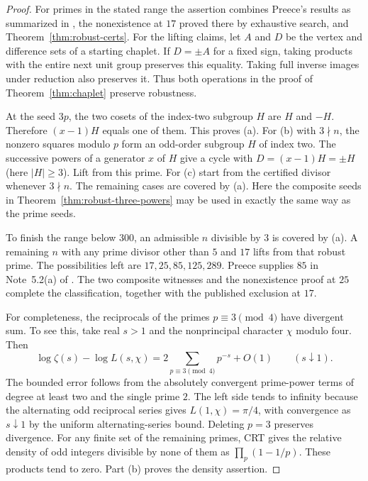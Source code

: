 \documentclass[11pt,a4paper]{article}
\begin{document}
\begin{proof}
For primes in the stated range the assertion combines Preece's results as summarized in \cite[Section~6]{mo}, the nonexistence at $17$ proved there by exhaustive search, and Theorem~\ref{thm:robust-certs}. For the lifting claims, let $A$ and $D$ be the vertex and difference sets of a starting chaplet. If $D=\pm A$ for a fixed sign, taking products with the entire next unit group preserves this equality. Taking full inverse images under reduction also preserves it. Thus both operations in the proof of Theorem~\ref{thm:chaplet} preserve robustness.
\par
At the seed $3p$, the two cosets of the index-two subgroup $H$ are $H$ and $-H$. Therefore $(x-1)H$ equals one of them. This proves (a). For (b) with $3\nmid n$, the nonzero squares modulo $p$ form an odd-order subgroup $H$ of index two. The successive powers of a generator $x$ of $H$ give a cycle with $D=(x-1)H=\pm H$ (here $|H|\ge3$). Lift from this prime. For (c) start from the certified divisor whenever $3\nmid n$. The remaining cases are covered by (a). Here the composite seeds in Theorem~\ref{thm:robust-three-powers} may be used in exactly the same way as the prime seeds.
\par
To finish the range below $300$, an admissible $n$ divisible by $3$ is covered by (a). A remaining $n$ with any prime divisor other than $5$ and $17$ lifts from that robust prime. The possibilities left are $17,25,85,125,289$. Preece supplies $85$ in Note~5.2(a) of \cite{chaplet}. The two composite witnesses and the nonexistence proof at $25$ complete the classification, together with the published exclusion at $17$.
\par
For completeness, the reciprocals of the primes $p\equiv3\pmod4$ have divergent sum. To see this, take real $s>1$ and the nonprincipal character $\chi$ modulo four. Then
\[
 \log\zeta(s)-\log L(s,\chi)=2\sum_{p\equiv3\pmod4}p^{-s}+O(1)
 \qquad(s\downarrow1).
\]
The bounded error follows from the absolutely convergent prime-power terms of degree at least two and the single prime $2$. The left side tends to infinity because the alternating odd reciprocal series gives $L(1,\chi)=\pi/4$, with convergence as $s\downarrow1$ by the uniform alternating-series bound. Deleting $p=3$ preserves divergence. For any finite set of the remaining primes, CRT gives the relative density of odd integers divisible by none of them as $\prod_p(1-1/p)$. These products tend to zero. Part (b) proves the density assertion.
\end{proof}
\end{document}
